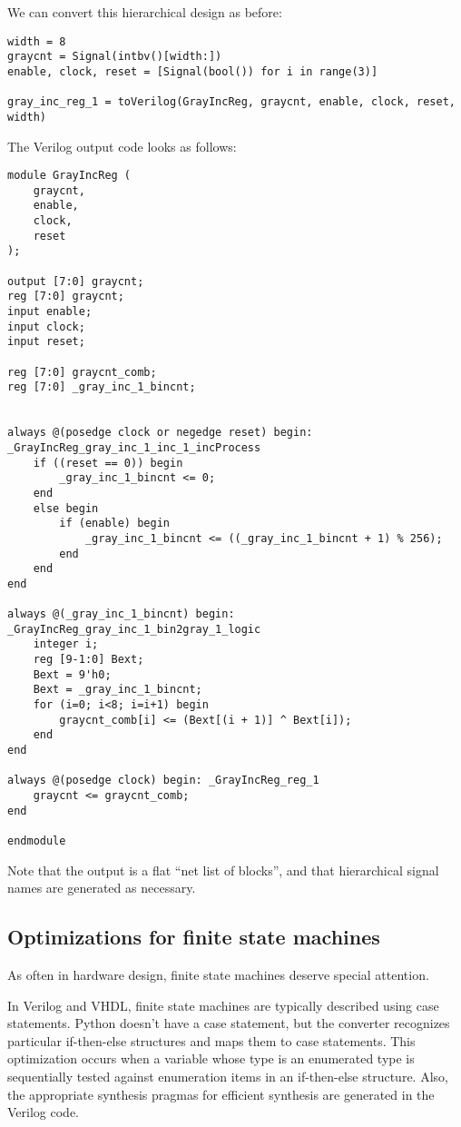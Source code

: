 We can convert this hierarchical design as before:

\begin{verbatim}
width = 8
graycnt = Signal(intbv()[width:])
enable, clock, reset = [Signal(bool()) for i in range(3)]

gray_inc_reg_1 = toVerilog(GrayIncReg, graycnt, enable, clock, reset, width)
\end{verbatim}

The Verilog output code looks as follows:

\begin{verbatim}
module GrayIncReg (
    graycnt,
    enable,
    clock,
    reset
);
 
output [7:0] graycnt;
reg [7:0] graycnt;
input enable;
input clock;
input reset;
 
reg [7:0] graycnt_comb;
reg [7:0] _gray_inc_1_bincnt;
 
 
always @(posedge clock or negedge reset) begin: _GrayIncReg_gray_inc_1_inc_1_incProcess
    if ((reset == 0)) begin
        _gray_inc_1_bincnt <= 0;
    end
    else begin
        if (enable) begin
            _gray_inc_1_bincnt <= ((_gray_inc_1_bincnt + 1) % 256);
        end
    end
end
 
always @(_gray_inc_1_bincnt) begin: _GrayIncReg_gray_inc_1_bin2gray_1_logic
    integer i;
    reg [9-1:0] Bext;
    Bext = 9'h0;
    Bext = _gray_inc_1_bincnt;
    for (i=0; i<8; i=i+1) begin
        graycnt_comb[i] <= (Bext[(i + 1)] ^ Bext[i]);
    end
end
 
always @(posedge clock) begin: _GrayIncReg_reg_1
    graycnt <= graycnt_comb;
end
 
endmodule
\end{verbatim}

Note that the output is a flat ``net list of blocks'', and
that hierarchical signal names are generated as necessary.

\subsection{Optimizations for finite state machines\label{conv-usage-fsm}}
As often in hardware design, finite state machines deserve special attention.

In Verilog and VHDL, finite state machines are typically described
using case statements.  Python doesn't have a case statement, but the
converter recognizes particular if-then-else structures and maps them
to case statements. This optimization occurs when a variable whose
type is an enumerated type is sequentially tested against enumeration
items in an if-then-else structure. Also, the appropriate synthesis
pragmas for efficient synthesis are generated in the Verilog code.

